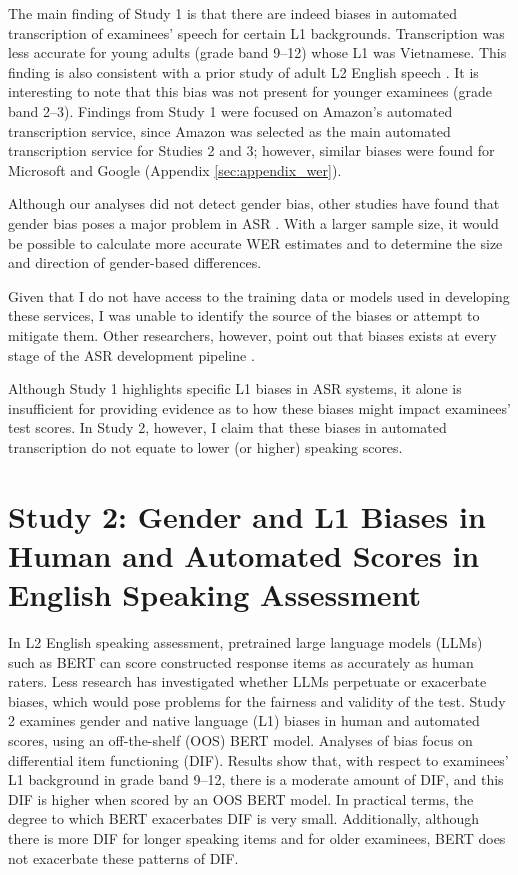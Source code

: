 \documentclass [PhD] {uclathes}
\begin{document}
The main finding of Study 1 is that there are indeed biases in automated transcription of examinees’ speech for certain L1 backgrounds. Transcription was less accurate for young adults (grade band 9–12) whose L1 was Vietnamese. This finding is also consistent with a prior study of adult L2 English speech \citep{chan2022training}. It is interesting to note that this bias was not present for younger examinees (grade band 2–3). Findings from Study 1 were focused on Amazon’s automated transcription service, since Amazon was selected as the main automated transcription service for Studies 2 and 3; however, similar biases were found for Microsoft and Google (Appendix \ref{sec:appendix_wer}). 

Although our analyses did not detect gender bias, other studies have found that gender bias poses a major problem in ASR \citep{hutiri2022}. With a larger sample size, it would be possible to calculate more accurate WER estimates and to determine the size and direction of gender-based differences. 

Given that I do not have access to the training data or models used in developing these services, I was unable to identify the source of the biases or attempt to mitigate them. Other researchers, however, point out that biases exists at every stage of the ASR development pipeline \citep{hutiri2022, suresh2021framework}.

Although Study 1 highlights specific L1 biases in ASR systems, it alone is insufficient for providing evidence as to how these biases might impact examinees’ test scores. In Study 2, however, I claim that these biases in automated transcription do not equate to lower (or higher) speaking scores.



\chapter{Study 2: Gender and L1 Biases in Human and Automated Scores in English Speaking Assessment}
\label{study2}

In L2 English speaking assessment, pretrained large language models (LLMs) such as BERT can score constructed response items as accurately as human raters. Less research has investigated whether LLMs perpetuate or exacerbate biases, which would pose problems for the fairness and validity of the test. Study 2 examines gender and native language (L1) biases in human and automated scores, using an off-the-shelf (OOS) BERT model. Analyses of bias focus on differential item functioning (DIF). Results show that, with respect to examinees’ L1 background in grade band 9–12, there is a moderate amount of DIF, and this DIF is higher when scored by an OOS BERT model. In practical terms, the degree to which BERT exacerbates DIF is very small. Additionally, although there is more DIF for longer speaking items and for older examinees, BERT does not exacerbate these patterns of DIF. 
\end{document}
